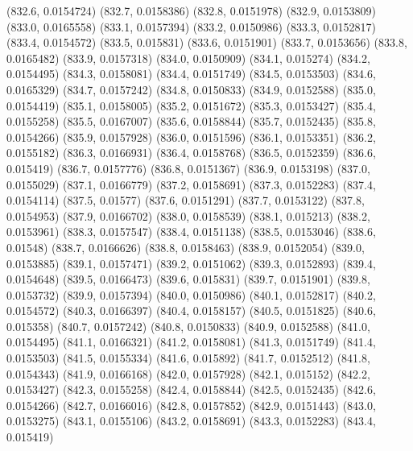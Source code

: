 {					(832.6, 0.0154724)
					(832.7, 0.0158386)
					(832.8, 0.0151978)
					(832.9, 0.0153809)
					(833.0, 0.0165558)
					(833.1, 0.0157394)
					(833.2, 0.0150986)
					(833.3, 0.0152817)
					(833.4, 0.0154572)
					(833.5, 0.015831)
					(833.6, 0.0151901)
					(833.7, 0.0153656)
					(833.8, 0.0165482)
					(833.9, 0.0157318)
					(834.0, 0.0150909)
					(834.1, 0.015274)
					(834.2, 0.0154495)
					(834.3, 0.0158081)
					(834.4, 0.0151749)
					(834.5, 0.0153503)
					(834.6, 0.0165329)
					(834.7, 0.0157242)
					(834.8, 0.0150833)
					(834.9, 0.0152588)
					(835.0, 0.0154419)
					(835.1, 0.0158005)
					(835.2, 0.0151672)
					(835.3, 0.0153427)
					(835.4, 0.0155258)
					(835.5, 0.0167007)
					(835.6, 0.0158844)
					(835.7, 0.0152435)
					(835.8, 0.0154266)
					(835.9, 0.0157928)
					(836.0, 0.0151596)
					(836.1, 0.0153351)
					(836.2, 0.0155182)
					(836.3, 0.0166931)
					(836.4, 0.0158768)
					(836.5, 0.0152359)
					(836.6, 0.015419)
					(836.7, 0.0157776)
					(836.8, 0.0151367)
					(836.9, 0.0153198)
					(837.0, 0.0155029)
					(837.1, 0.0166779)
					(837.2, 0.0158691)
					(837.3, 0.0152283)
					(837.4, 0.0154114)
					(837.5, 0.01577)
					(837.6, 0.0151291)
					(837.7, 0.0153122)
					(837.8, 0.0154953)
					(837.9, 0.0166702)
					(838.0, 0.0158539)
					(838.1, 0.015213)
					(838.2, 0.0153961)
					(838.3, 0.0157547)
					(838.4, 0.0151138)
					(838.5, 0.0153046)
					(838.6, 0.01548)
					(838.7, 0.0166626)
					(838.8, 0.0158463)
					(838.9, 0.0152054)
					(839.0, 0.0153885)
					(839.1, 0.0157471)
					(839.2, 0.0151062)
					(839.3, 0.0152893)
					(839.4, 0.0154648)
					(839.5, 0.0166473)
					(839.6, 0.015831)
					(839.7, 0.0151901)
					(839.8, 0.0153732)
					(839.9, 0.0157394)
					(840.0, 0.0150986)
					(840.1, 0.0152817)
					(840.2, 0.0154572)
					(840.3, 0.0166397)
					(840.4, 0.0158157)
					(840.5, 0.0151825)
					(840.6, 0.015358)
					(840.7, 0.0157242)
					(840.8, 0.0150833)
					(840.9, 0.0152588)
					(841.0, 0.0154495)
					(841.1, 0.0166321)
					(841.2, 0.0158081)
					(841.3, 0.0151749)
					(841.4, 0.0153503)
					(841.5, 0.0155334)
					(841.6, 0.015892)
					(841.7, 0.0152512)
					(841.8, 0.0154343)
					(841.9, 0.0166168)
					(842.0, 0.0157928)
					(842.1, 0.015152)
					(842.2, 0.0153427)
					(842.3, 0.0155258)
					(842.4, 0.0158844)
					(842.5, 0.0152435)
					(842.6, 0.0154266)
					(842.7, 0.0166016)
					(842.8, 0.0157852)
					(842.9, 0.0151443)
					(843.0, 0.0153275)
					(843.1, 0.0155106)
					(843.2, 0.0158691)
					(843.3, 0.0152283)
					(843.4, 0.015419)
}
